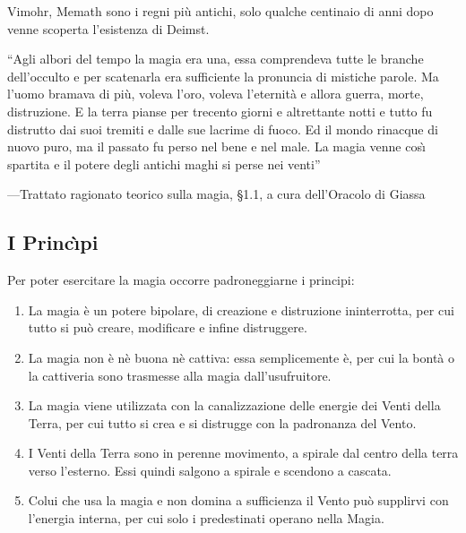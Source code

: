Vimohr, Memath sono i regni pi\`u antichi, solo qualche centinaio di
anni dopo venne scoperta l'esistenza di Deimst.

\iffullversion
\begin{racconto}
  ``Agli albori del tempo la magia era una, essa comprendeva tutte le
  branche dell'occulto e per scatenarla era sufficiente la pronuncia
  di mistiche parole. Ma l'uomo bramava di pi\`u, voleva l'oro,
  voleva l'eternit\`a e allora guerra, morte, distruzione. E la
  terra pianse per trecento giorni e altrettante notti e tutto fu
  distrutto dai suoi tremiti e dalle sue lacrime di fuoco. Ed il mondo
  rinacque di nuovo puro, ma il passato fu perso nel bene e nel male.
  La magia venne cos\`{\i} spartita e il potere degli antichi maghi si
  perse nei venti''

\bigskip
\hfill{\rm\raggedleft ---Trattato ragionato teorico sulla magia, \S 1.1, a cura dell'Oracolo di Giassa}
\bigskip
\end{racconto}

\fi
\subsection{I Princ\`{\i}pi}

Per poter esercitare la magia occorre padroneggiarne i principi:

\begin{enumerate}
\item La magia \`e un potere bipolare, di creazione e distruzione
  ininterrotta, per cui tutto si pu\`o creare, modificare e infine
  distruggere.
  
\item La magia non \`e n\`e buona n\`e cattiva: essa semplicemente
  \`e, per cui la bont\`a o la cattiveria sono trasmesse alla
  magia dall'usufruitore.
  
\item La magia viene utilizzata con la canalizzazione delle energie
  dei Venti della Terra, per cui tutto si crea e si distrugge con la
  padronanza del Vento.
  
\item I Venti della Terra sono in perenne movimento, a spirale dal
  centro della terra verso l'esterno. Essi quindi salgono a spirale e
  scendono a cascata.
  
\item Colui che usa la magia e non domina a sufficienza il Vento
  pu\`o supplirvi con l'energia interna, per cui solo i predestinati
  operano nella Magia.

\end{enumerate}

